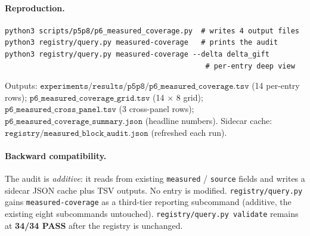 \paragraph{Reproduction.}
\begin{verbatim}
python3 scripts/p5p8/p6_measured_coverage.py  # writes 4 output files
python3 registry/query.py measured-coverage   # prints the audit
python3 registry/query.py measured-coverage --delta delta_gift
                                               # per-entry deep view
\end{verbatim}
Outputs: $\texttt{experiments/results/p5p8/p6\_measured\_coverage.tsv}$
(14 per-entry rows); $\texttt{p6\_measured\_coverage\_grid.tsv}$
(14 $\times$ 8 grid); $\texttt{p6\_measured\_cross\_panel.tsv}$
(3 cross-panel rows); $\texttt{p6\_measured\_coverage\_summary.json}$
(headline numbers). Sidecar cache:
$\texttt{registry/measured\_block\_audit.json}$ (refreshed each run).

\paragraph{Backward compatibility.}
The audit is \emph{additive}: it reads from existing
\texttt{measured} / \texttt{source} fields and writes a sidecar
JSON cache plus TSV outputs. No entry is modified.
\texttt{registry/query.py} gains \texttt{measured-coverage} as a
third-tier reporting subcommand (additive, the existing eight
subcommands untouched). \texttt{registry/query.py validate}
remains at \textbf{34/34 PASS} after the registry is unchanged.
